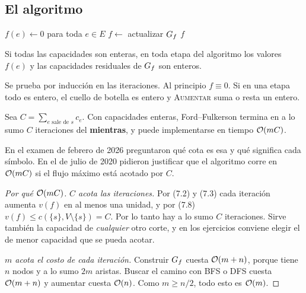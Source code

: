 \subsection{El algoritmo}

\begin{algorithmic}[1]
  \State $f(e)\gets 0$ para toda $e\in E$
    \State $f\gets$ 
    \State actualizar $G_f$
  \EndWhile
  \State \Return $f$
\EndFunction
\end{algorithmic}

\begin{resultado}
Si todas las capacidades son enteras, en toda etapa del algoritmo los valores $f(e)$ y las capacidades residuales de $G_f$ son enteros.
\end{resultado}
Se prueba por inducción en las iteraciones. Al principio $f\equiv 0$. Si en una etapa todo es entero, el cuello de botella es entero y \textsc{Aumentar} suma o resta un entero.

\begin{resultado}[(7.4) y (7.5)]
Sea $C=\sum_{e\text{ sale de }s}c_e$. Con capacidades enteras, Ford–Fulkerson termina en a lo sumo $C$ iteraciones del \textbf{mientras}, y puede implementarse en tiempo $\mathcal{O}(mC)$.
\end{resultado}

En el examen de febrero de 2026 preguntaron qué cota es esa y qué significa cada símbolo. En el de julio de 2020 pidieron justificar que el algoritmo corre en $\mathcal{O}(mC)$ si el flujo máximo está acotado por $C$.

\begin{proof}[Por qué $\mathcal{O}(mC)$]
\emph{$C$ acota las iteraciones.} Por (7.2) y (7.3) cada iteración aumenta $v(f)$ en al menos una unidad, y por (7.8) $v(f)\le c(\{s\},V\setminus\{s\})=C$. Por lo tanto hay a lo sumo $C$ iteraciones. Sirve también la capacidad de \emph{cualquier} otro corte, y en los ejercicios conviene elegir el de menor capacidad que se pueda acotar.

\emph{$m$ acota el costo de cada iteración.} Construir $G_f$ cuesta $\mathcal{O}(m+n)$, porque tiene $n$ nodos y a lo sumo $2m$ aristas. Buscar el camino con BFS o DFS cuesta $\mathcal{O}(m+n)$ y aumentar cuesta $\mathcal{O}(n)$. Como $m\ge n/2$, todo esto es $\mathcal{O}(m)$.
\end{proof}

